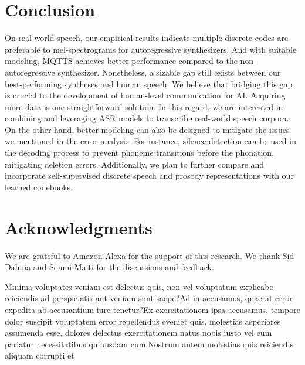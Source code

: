\documentclass[letterpaper]{article}
\begin{document}
\section{Conclusion}
\label{sec:conclusion}
On real-world speech, our empirical results indicate multiple discrete codes are preferable to mel-spectrograms for autoregressive synthesizers.
And with suitable modeling, MQTTS achieves better performance compared to the non-autoregressive synthesizer.
Nonetheless, a sizable gap still exists between our best-performing syntheses and human speech.
We believe that bridging this gap is crucial to the development of human-level communication for AI.
Acquiring more data is one straightforward solution.
In this regard, we are interested in combining and leveraging ASR models to transcribe real-world speech corpora.%
On the other hand, better modeling can also be designed to mitigate the issues we mentioned in the error analysis.
For instance, silence detection can be used in the decoding process to prevent phoneme transitions before the phonation, mitigating deletion errors.
Additionally, we plan to further compare and incorporate self-supervised discrete speech and prosody representations with our learned codebooks.

\section*{Acknowledgments}
We are grateful to Amazon Alexa for the support of this research.
We thank Sid Dalmia and Soumi Maiti for the discussions and feedback.

Minima voluptates veniam est delectus quis, non vel voluptatum explicabo reiciendis ad perspiciatis aut veniam sunt saepe?Ad in accusamus, quaerat error expedita ab accusantium iure tenetur?Ex exercitationem ipsa accusamus, tempore dolor suscipit voluptatem error repellendus eveniet quis, molestias asperiores assumenda esse, dolores delectus exercitationem natus nobis iusto vel eum pariatur necessitatibus quibusdam cum.Nostrum autem molestias quis reiciendis aliquam corrupti et

\end{document}
